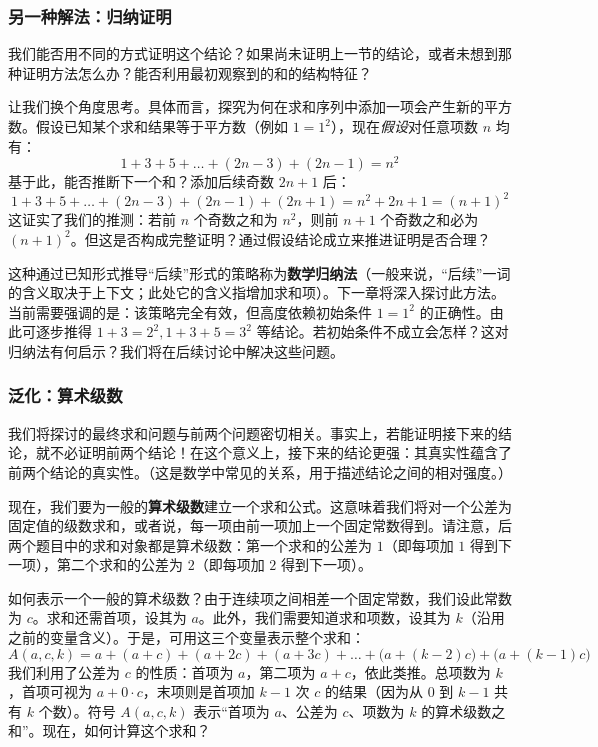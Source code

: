 \subsubsection*{另一种解法：归纳证明}

我们能否用不同的方式证明这个结论？如果尚未证明上一节的结论，或者未想到那种证明方法怎么办？能否利用最初观察到的和的结构特征？

让我们换个角度思考。具体而言，探究为何在求和序列中添加一项会产生新的平方数。假设已知某个求和结果等于平方数（例如 $1 = 1^2$），现在\emph{假设}对任意项数 $n$ 均有：
\[1 + 3 + 5 + \dots + (2n - 3) + (2n - 1) = n^2\]
基于此，能否推断下一个和？添加后续奇数 $2n + 1$ 后：
\[1 + 3 + 5 + \dots + (2n - 3) + (2n - 1) + (2n + 1) = n^2 + 2n + 1 = (n + 1)^2\]
这证实了我们的推测：若前 $n$ 个奇数之和为 $n^2$，则前 $n+1$ 个奇数之和必为 $(n+1)^2$。但这是否构成完整证明？通过假设结论成立来推进证明是否合理？

这种通过已知形式推导``后续''形式的策略称为\textbf{数学归纳法}（一般来说，``后续''一词的含义取决于上下文；此处它的含义指增加求和项）。下一章将深入探讨此方法。当前需要强调的是：该策略完全有效，但高度依赖初始条件 $1 = 1^2$ 的正确性。由此可逐步推得 $1+3=2^2, 1+3+5=3^2$ 等结论。若初始条件不成立会怎样？这对归纳法有何启示？我们将在后续讨论中解决这些问题。

\subsubsection*{泛化：算术级数}

我们将探讨的最终求和问题与前两个问题密切相关。事实上，若能证明接下来的结论，就不必证明前两个结论！在这个意义上，接下来的结论更强：其真实性蕴含了前两个结论的真实性。（这是数学中常见的关系，用于描述结论之间的相对强度。）

现在，我们要为一般的\textbf{算术级数}建立一个求和公式。这意味着我们将对一个公差为固定值的级数求和，或者说，每一项由前一项加上一个固定常数得到。请注意，后两个题目中的求和对象都是算术级数：第一个求和的公差为 $1$（即每项加 $1$ 得到下一项），第二个求和的公差为 $2$（即每项加 $2$ 得到下一项）。

如何表示一个一般的算术级数？由于连续项之间相差一个固定常数，我们设此常数为 $c$。求和还需首项，设其为 $a$。此外，我们需要知道求和项数，设其为 $k$（沿用之前的变量含义）。于是，可用这三个变量表示整个求和：
\[A(a, c, k) = a + (a + c) + (a + 2c) + (a + 3c) + \dots + \big(a + (k - 2)c\big) + \big(a + (k - 1)c\big)\]
我们利用了公差为 $c$ 的性质：首项为 $a$，第二项为 $a + c$，依此类推。总项数为 $k$，首项可视为 $a + 0 \cdot c$，末项则是首项加 $k - 1$ 次 $c$ 的结果（因为从 $0$ 到 $k - 1$ 共有 $k$ 个数）。符号 $A(a, c, k)$ 表示``首项为 $a$、公差为 $c$、项数为 $k$ 的算术级数之和''。现在，如何计算这个求和？

